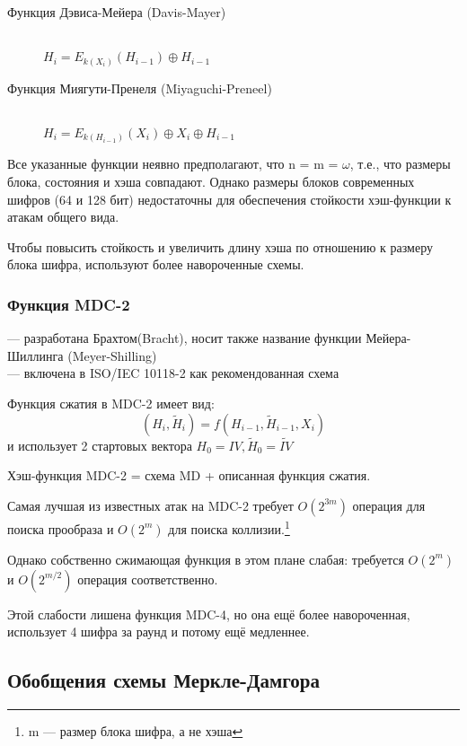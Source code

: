 \begin{description}
  \item[Функция Дэвиса-Мейера (Davis-Mayer)] \hfill \\
  $H_{i} = E_{k(X_{i})}(H_{i-1}) \oplus H_{i-1}$
  \item[Функция Миягути-Пренеля (Miyaguchi-Preneel)] \hfill \\
  $H_{i} = E_{k(H_{i-1})}(X_{i}) \oplus X_{i} \oplus H_{i-1}$
\end{description}

Все указанные функции неявно предполагают, что n = m = $\omega$, т.е., что
размеры блока, состояния и хэша совпадают. Однако размеры блоков современных
шифров (64 и 128 бит) недостаточны для обеспечения стойкости хэш-функции
к атакам общего вида.

Чтобы повысить стойкость и увеличить длину хэша по отношению к размеру
блока шифра, используют более навороченные схемы.\\[0.3cm]

\subsubsection{Функция MDC-2}
--- разработана Брахтом(Bracht), носит также название функции Мейера-Шиллинга
(Meyer-Shilling)\\
--- включена в ISO/IEC 10118-2 как рекомендованная схема

Функция сжатия в MDC-2 имеет вид:\\[0.3cm]
\[(H_{i},\widetilde{H}_{i}) = f(H_{i-1},\widetilde{H}_{i-1}, X_{i})\]
и использует 2 стартовых вектора $H_{0} = IV, \widetilde{H}_{0} = 
\widetilde{IV}$

Хэш-функция MDC-2 = схема MD + описанная функция сжатия.

Самая лучшая из известных атак на MDC-2 требует $O(2^{3m})$ операция для
поиска прообраза и $O(2^{m})$ для поиска коллизии.\footnote{m --- размер
блока шифра, а не хэша}


Однако собственно сжимающая функция в этом плане слабая: требуется
$O(2^{m})$ и $O(2^{m/2})$ операция соответственно.

Этой слабости лишена функция MDC-4, но она ещё более навороченная, 
использует 4 шифра за раунд и потому ещё медленнее.\\[0.5cm]

\subsection{Обобщения схемы Меркле-Дамгора}

